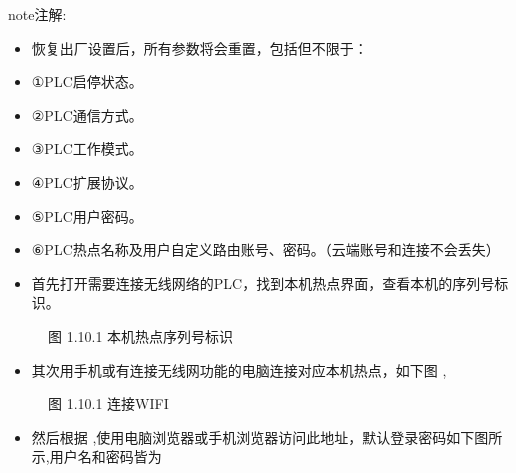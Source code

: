 \documentclass[a4paper,10pt,english]{sphinxmanual}
\begin{document}
\begin{sphinxadmonition}{note}{注解:}\begin{itemize}
\item {} 
\sphinxAtStartPar
恢复出厂设置后，所有参数将会重置，包括但不限于：

\item {} 
\sphinxAtStartPar
①PLC启停状态。

\item {} 
\sphinxAtStartPar
②PLC通信方式。

\item {} 
\sphinxAtStartPar
③PLC工作模式。

\item {} 
\sphinxAtStartPar
④PLC扩展协议。

\item {} 
\sphinxAtStartPar
⑤PLC用户密码。

\item {} 
\sphinxAtStartPar
⑥PLC热点名称及用户自定义路由账号、密码。（云端账号和连接不会丢失）

\end{itemize}
\end{sphinxadmonition}

\sphinxAtStartPar
{}
\begin{itemize}
\item {} 
\sphinxAtStartPar
首先打开需要连接无线网络的PLC，找到本机热点界面，查看本机的序列号标识。

\end{itemize}

\begin{figure}[htbp]
\centering
\capstart

\noindent{}
\caption{图 1.10.1 本机热点序列号标识}\label{\detokenize{operation_guide:id27}}\end{figure}
\begin{itemize}
\item {} 
\sphinxAtStartPar
其次用手机或有连接无线网功能的电脑连接对应本机热点，如下图 ,

\end{itemize}

\begin{figure}[htbp]
\centering
\capstart

\noindent{}
\caption{图 1.10.1 连接WIFI}\label{\detokenize{operation_guide:id28}}\end{figure}
\begin{itemize}
\item {} 
\sphinxAtStartPar
然后根据   ,使用电脑浏览器或手机浏览器访问此地址，默认登录密码如下图所示,用户名和密码皆为 

\end{itemize}
\end{document}
